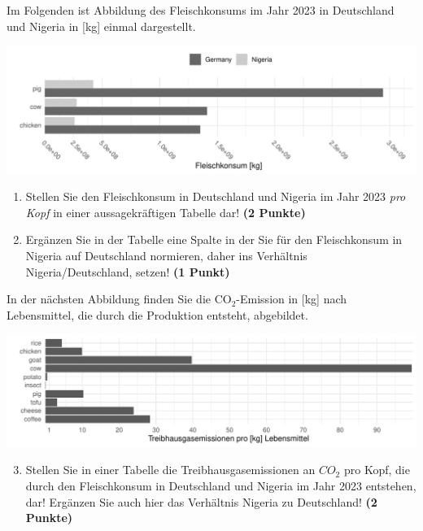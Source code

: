 \documentclass[a4paper, 9pt]{scrartcl}\usepackage[]{graphicx}\usepackage[]{xcolor}
\makeatletter
\def\maxwidth{ %
  \ifdim\Gin@nat@width>\linewidth
    \linewidth
  \else
    \Gin@nat@width
  \fi
}
\newenvironment{knitrout}{}{} %
\makeatother
\begin{document}
Im Folgenden ist Abbildung des Fleischkonsums im Jahr 2023 in Deutschland und Nigeria in [kg] einmal dargestellt. 

\begin{knitrout}
\color{fgcolor}

{\centering \includegraphics[width=\maxwidth]{img/math-14-a-1} 

}


\end{knitrout}
  
\begin{enumerate}
\item Stellen Sie den Fleischkonsum in Deutschland und Nigeria im Jahr 2023 \textit{pro Kopf} in einer aussagekräftigen Tabelle dar! \textbf{(2 Punkte)}
\item Ergänzen Sie in der Tabelle eine Spalte in der Sie für den Fleischkonsum in Nigeria auf Deutschland normieren, daher ins Verhältnis Nigeria/Deutschland, setzen! \textbf{(1 Punkt)}
\end{enumerate}

In der nächsten Abbildung finden Sie die CO$_2$-Emission in [kg] nach Lebensmittel, die durch die Produktion entsteht, abgebildet.

\begin{knitrout}
\color{fgcolor}

{\centering \includegraphics[width=\maxwidth]{img/math-14-b-1} 

}


\end{knitrout}

\begin{enumerate}
  \setcounter{enumi}{2}  
\item Stellen Sie in einer Tabelle die Treibhausgasemissionen an $CO_2$ pro Kopf, die durch den Fleischkonsum in Deutschland und Nigeria im Jahr 2023 entstehen, dar! Ergänzen Sie auch hier das Verhältnis Nigeria zu Deutschland! \textbf{(2 Punkte)}
\end{enumerate}
\end{document}
